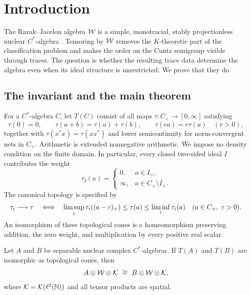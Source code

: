 \section{Introduction}\label{sec:introduction}

The Razak--Jacelon algebra \(\mathcal W\) is a simple, monotracial,
stably projectionless nuclear \(C^*\)-algebra
\cite{Jacelon}. Tensoring by \(\mathcal W\) removes the
\(K\)-theoretic part of the classification problem and makes the order
on the Cuntz semigroup visible through traces. The question is whether
the resulting trace data determine the algebra even when its ideal
structure is unrestricted. We prove that they do.

\subsection{The invariant and the main theorem}

For a \(C^*\)-algebra \(C\), let \(T(C)\) consist of all maps
\(\tau:C_+\to[0,\infty]\) satisfying
\[
 \tau(0)=0,\qquad
 \tau(a+b)=\tau(a)+\tau(b),\qquad
 \tau(ra)=r\tau(a)\quad(r>0),
\]
together with \(\tau(x^*x)=\tau(xx^*)\) and lower semicontinuity for
norm-convergent nets in \(C_+\). Arithmetic is extended nonnegative
arithmetic. We impose no density condition on the finite domain.
In particular, every closed two-sided ideal \(I\) contributes the weight
\begin{equation}\label{intro:ideal-weight}
 \tau_I(a)=
 \begin{cases}
  0,&a\in I_+,\\
  \infty,&a\in C_+\setminus I_+.
 \end{cases}
\end{equation}
The canonical topology is specified by
\begin{equation}\label{intro:trace-topology}
 \tau_i\longrightarrow\tau
 \quad\Longleftrightarrow\quad
 \limsup_i\tau_i((a-\varepsilon)_+)
 \leq\tau(a)\leq\liminf_i\tau_i(a)
 \quad(a\in C_+,\ \varepsilon>0).
\end{equation}
An isomorphism of these topological cones is a homeomorphism preserving
addition, the zero weight, and multiplication by every positive real
scalar.

\begin{theorem}\label{thm:main}
Let \(A\) and \(B\) be separable nuclear complex \(C^*\)-algebras.
If \(T(A)\) and \(T(B)\) are isomorphic as topological cones, then
\[
 A\otimes\W\otimes\K\ \cong\ B\otimes\W\otimes\K,
\]
where \(\mathcal K=\mathcal K(\ell^2(\mathbb N))\) and all tensor products are spatial.
\end{theorem}

